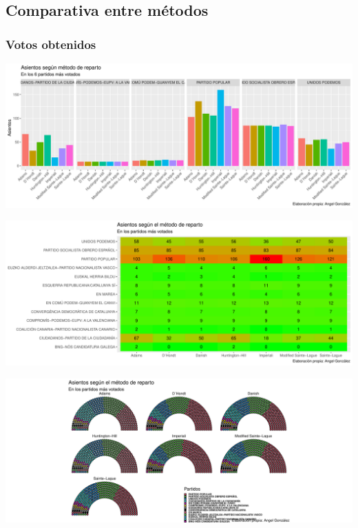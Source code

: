 \documentclass[12pt,a4paper,]{book}
\numberwithin{dummy}{section}
\theoremstyle{ocrenumbox}
\theoremstyle{blacknumex}
\theoremstyle{blacknumbox}
\theoremstyle{ocrenum}
\theoremstyle{ocrenum}
\begin{document}
\hypertarget{comparativa-entre-muxe9todos-12}{%
\subsection{Comparativa entre
métodos}\label{comparativa-entre-muxe9todos-12}}

\hypertarget{votos-obtenidos-12}{%
\subsubsection{Votos obtenidos}\label{votos-obtenidos-12}}

\begin{center}\includegraphics[width=0.95\linewidth]{figurasR/unnamed-chunk-167-1} \end{center}

\begin{center}\includegraphics[width=0.95\linewidth]{figurasR/unnamed-chunk-167-2} \end{center}

\begin{center}\includegraphics[width=0.95\linewidth]{figurasR/unnamed-chunk-167-3} \end{center}
\end{document}
